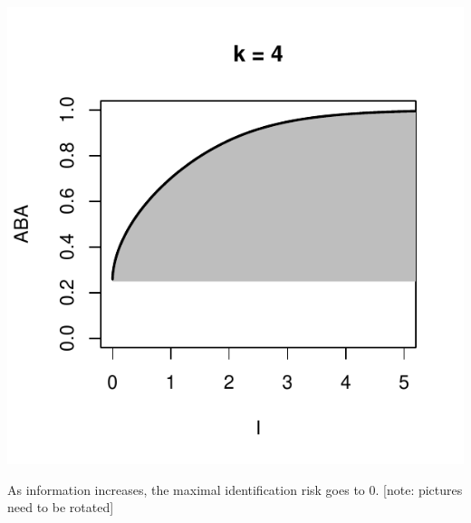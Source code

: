\documentclass{beamer}
\begin{document}
\begin{frame}
\begin{center}
\includegraphics[scale = 0.34]{ck_4.pdf}
\end{center}
As information increases, the maximal identification risk goes to 0.
[note: pictures need to be rotated]

\end{frame}


\end{document}
